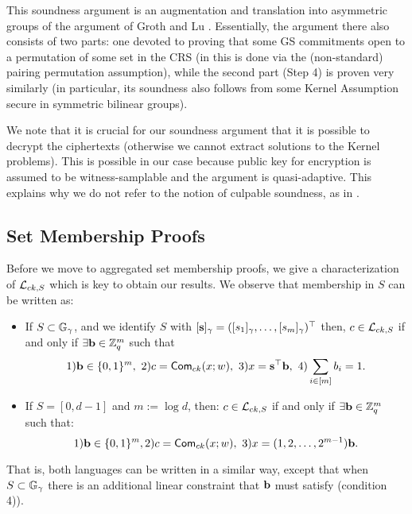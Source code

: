This soundness argument is an augmentation and translation into asymmetric groups of the argument of Groth and Lu \cite{AC:GroLu07}. Essentially, the argument there also consists of two parts: one devoted to proving that some GS commitments open to a permutation of some set in the CRS (in \cite{AC:GroLu07} this is done via the (non-standard) pairing permutation assumption), while the second part (Step 4) is proven very similarly (in particular, its soundness also follows from some Kernel Assumption secure in symmetric bilinear groups). 

We note that it is crucial for our soundness argument that it is possible to decrypt the ciphertexts (otherwise we cannot extract solutions to the Kernel problems). This is possible in our case because public key for encryption is assumed to be witness-samplable and the argument is quasi-adaptive. This explains why we do not refer to the notion of culpable soundness, as in \cite{AC:GroLu07,EPRINT:FauLip15}.


\subsection{Set Membership Proofs}
Before we move to aggregated set membership proofs, we give a characterization of $\mathcal{L}_{ck,S}$ which is key to obtain our results. We observe that membership in $S$ can be written as:
\begin{itemize}
\item If $S \subset \mathbb{G}_{\gamma}$, and we identify $S$ with $[\mathbf{s}]_\gamma=([s_1]_\gamma,\ldots,[s_m]_\gamma)^\top$ then, 
$c \in \mathcal{L}_{ck,S}$ if and only if $\exists \mathbf{b} \in \mathbb{Z}_q^{m}$ such that
\vspace{-0.3cm}
$$ 1) \mathbf{b} \in \{0,1\}^{m}, \ 2) c=\mathsf{Com}_{ck}(x;w), \ 3) x=\mathbf{s}^{\top} \mathbf{b}, \ 4) \sum_{i \in [m]} b_i=1.$$
\vspace{-0.3cm}
\item If $S=[0,d-1]$ and $m:=\log d$, then: 
$c \in \mathcal{L}_{ck,S}$ if and only if $\exists \mathbf{b} \in \mathbb{Z}_q^{m}$ such that:   
\vspace{-0.3cm}
$$ 1) \mathbf{b} \in \{0,1\}^{m}, 2) c=\mathsf{Com}_{ck}(x;w), \ 3) x=(1,2,\ldots,2^{m-1}) \mathbf{b} .$$
\end{itemize} 
\vspace{-0.2cm}
That is, both languages can be written in a similar way, except that when $S \subset \mathbb{G}_{\gamma}$ there is an additional linear constraint that $\mathbf{b}$ must satisfy (condition 4)). 

